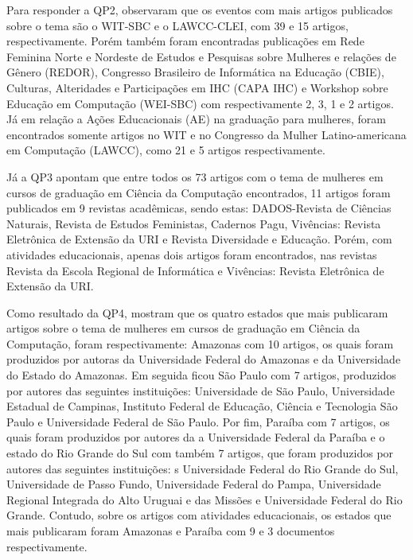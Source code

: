 Para responder a QP2, observaram que os eventos com mais artigos publicados sobre o tema são o WIT-SBC e o LAWCC-CLEI, com 39 e 15 artigos, respectivamente. Porém também foram encontradas publicações em Rede Feminina Norte e Nordeste de Estudos e Pesquisas sobre Mulheres e relações de Gênero (REDOR), Congresso Brasileiro de Informática na Educação (CBIE), Culturas, Alteridades e Participações em IHC (CAPA IHC) e Workshop sobre Educação em Computação (WEI-SBC) com respectivamente 2, 3, 1 e 2 artigos. Já em relação a Ações Educacionais (AE) na graduação para mulheres, foram encontrados somente artigos no WIT e no Congresso da Mulher Latino-americana em Computação (LAWCC), como 21 e 5 artigos respectivamente. 

Já a QP3 apontam que entre todos os 73 artigos com o tema de mulheres em cursos de graduação em Ciência da Computação encontrados, 11 artigos foram publicados em 9 revistas acadêmicas, sendo estas: DADOS-Revista de Ciências Naturais, Revista de Estudos Feministas, Cadernos Pagu, Vivências: Revista Eletrônica de Extensão da URI e Revista Diversidade e Educação. Porém, com atividades educacionais, apenas dois artigos foram encontrados, nas revistas Revista da Escola Regional de Informática e Vivências: Revista Eletrônica de Extensão da URI. 

Como resultado da QP4, mostram que os quatro estados que mais publicaram artigos sobre o tema de mulheres em cursos de graduação em Ciência da Computação, foram respectivamente: Amazonas com 10 artigos, os quais foram produzidos por autoras da Universidade Federal do Amazonas e da Universidade do Estado do Amazonas. Em seguida ficou São Paulo com 7 artigos, produzidos por autores das seguintes instituições: Universidade de São Paulo, Universidade Estadual de Campinas, Instituto Federal de Educação, Ciência e Tecnologia São Paulo e Universidade Federal de São Paulo. Por fim, Paraíba com 7 artigos, os quais foram produzidos por autores da a Universidade Federal da Paraíba e o estado do Rio Grande do Sul com também 7 artigos, que foram produzidos por autores das seguintes instituições: s Universidade Federal do Rio Grande do Sul, Universidade de Passo Fundo, Universidade Federal do Pampa, Universidade Regional Integrada do Alto Uruguai e das Missões e Universidade Federal do Rio Grande. Contudo, sobre os artigos com atividades educacionais, os estados que mais publicaram foram Amazonas e Paraíba com 9 e 3 documentos respectivamente.

